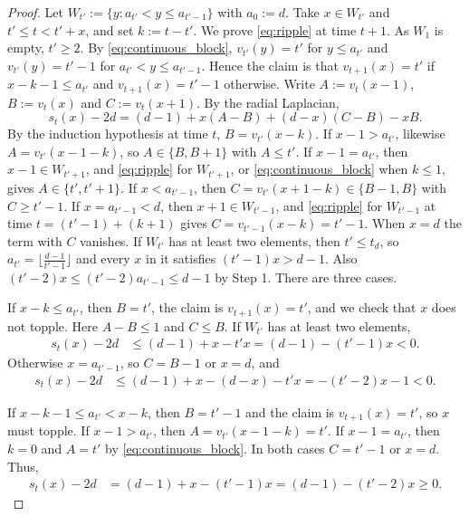 \documentclass[12pt]{amsart}
\begin{document}
\begin{proof}
		Let $W_{t'} := \{ y : a_{t'} < y \leq a_{t'-1} \}$ with $a_0 := d$. Take $x \in W_{t'}$ and $t' \leq t < t' + x$, and set $k := t - t'$. We prove \eqref{eq:ripple} at time $t+1$. As $W_1$ is empty, $t' \geq 2$.
		By \eqref{eq:continuous_block}, $v_{t'}(y) = t'$ for $y \leq a_{t'}$ and $v_{t'}(y) = t'-1$ for $a_{t'} < y \leq a_{t'-1}$. Hence the claim is that $v_{t+1}(x) = t'$ if $x - k - 1 \leq a_{t'}$ and $v_{t+1}(x) = t'-1$ otherwise.
		Write $A := v_t(x-1)$, $B := v_t(x)$ and $C := v_t(x+1)$. By the radial Laplacian,
		\begin{equation*}
		s_t(x) - 2d = (d-1) + x (A - B) + (d-x)(C - B) - x B.
		\end{equation*}
		By the induction hypothesis at time $t$, $B = v_{t'}(x-k)$. If $x - 1 > a_{t'}$, likewise $A = v_{t'}(x-1-k)$, so $A \in \{B, B+1\}$ with $A \leq t'$.
		If $x - 1 = a_{t'}$, then $x-1 \in W_{t'+1}$, and \eqref{eq:ripple} for $W_{t'+1}$, or \eqref{eq:continuous_block} when $k \leq 1$, gives $A \in \{t', t'+1\}$.
		If $x < a_{t'-1}$, then $C = v_{t'}(x+1-k) \in \{B-1, B\}$ with $C \geq t'-1$.
		If $x = a_{t'-1} < d$, then $x + 1 \in W_{t'-1}$, and \eqref{eq:ripple} for $W_{t'-1}$ at time $t = (t'-1) + (k+1)$ gives $C = v_{t'-1}(x-k) = t'-1$.
		When $x = d$ the term with $C$ vanishes. If $W_{t'}$ has at least two elements, then $t' \leq t_d$, so $a_{t'} = \lfloor \frac{d-1}{t'-1} \rfloor$ and every $x$ in it satisfies $(t'-1) x > d-1$.
		Also $(t'-2) x \leq (t'-2) a_{t'-1} \leq d-1$ by Step 1. There are three cases.
		
		If $x - k \leq a_{t'}$, then $B = t'$, the claim is $v_{t+1}(x) = t'$, and we check that $x$ does not topple. Here $A - B \leq 1$ and $C \leq B$.
		If $W_{t'}$ has at least two elements,
		\begin{align*}
		s_t(x) - 2d &\leq (d-1) + x - t' x = (d-1) - (t'-1) x < 0.
		\end{align*}
		Otherwise $x = a_{t'-1}$, so $C = B - 1$ or $x = d$, and
		\begin{align*}
		s_t(x) - 2d &\leq (d-1) + x - (d-x) - t' x = -(t'-2) x - 1 < 0.
		\end{align*}
		
		If $x - k - 1 \leq a_{t'} < x - k$, then $B = t'-1$ and the claim is $v_{t+1}(x) = t'$, so $x$ must topple.
		If $x - 1 > a_{t'}$, then $A = v_{t'}(x-1-k) = t'$. If $x - 1 = a_{t'}$, then $k = 0$ and $A = t'$ by \eqref{eq:continuous_block}. In both cases $C = t'-1$ or $x = d$. Thus,
		\begin{align*}
		s_t(x) - 2d &= (d-1) + x - (t'-1) x = (d-1) - (t'-2) x \geq 0.
		\end{align*}
		

\end{proof}
\end{document}

